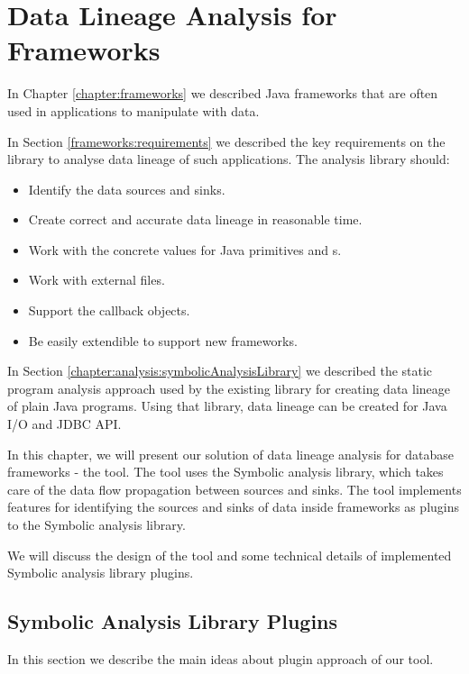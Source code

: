 
\chapter{Data Lineage Analysis for Frameworks \label{chapter:implementation}}

In Chapter \ref{chapter:frameworks} we described Java frameworks
that are often used in applications to manipulate with data.

In Section \ref{frameworks:requirements} we described the key requirements
on the library to analyse data lineage of such applications.
The analysis library should:
\begin{itemize}
  \item Identify the data sources and sinks.
  \item Create correct and accurate data lineage in reasonable time.
  \item Work with the concrete values for Java primitives and s.
  \item Work with external files.
  \item Support the callback objects.
  \item Be easily extendible to support new frameworks.
\end{itemize}

In Section \ref{chapter:analysis:symbolicAnalysisLibrary} we described the
static program analysis approach used by the existing library
for creating data lineage of plain Java programs.
Using that library, data lineage can be created for Java I/O and JDBC API.

In this chapter, we will present our solution of data lineage analysis
for database frameworks - the \ToolName tool.
The \ToolName tool uses the Symbolic analysis library, which takes
care of the data flow propagation between sources and sinks.
The \ToolName tool implements features for identifying the sources
and sinks of data inside frameworks as plugins to the Symbolic analysis library.

We will discuss the design of the \ToolName tool and some technical details
of implemented Symbolic analysis library plugins.




\section{Symbolic Analysis Library Plugins}

In this section we describe the main ideas about plugin approach of our \ToolName tool.

